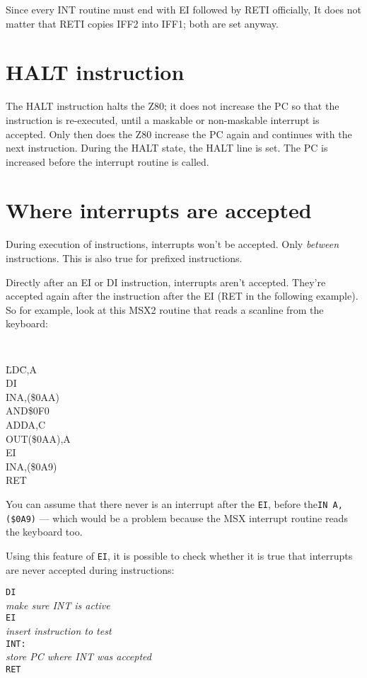 \documentclass[oneside,a4paper]{book}
\begin{document}
Since every INT routine must end with {\ttfamily EI} followed by {\ttfamily RETI} officially, It does not matter that RETI copies IFF2 into IFF1; both are set anyway.


\section{HALT instruction}

The HALT instruction halts the Z80; it does not increase the PC so that the instruction is re-executed, until a maskable or non-maskable interrupt is accepted. Only then does the Z80 increase the PC again and continues with the next instruction. During the HALT state, the HALT line is set. The PC is increased before the interrupt routine is called.


\section{Where interrupts are accepted}

During execution of instructions, interrupts won't be accepted. Only {\em between} instructions. This is also true for prefixed instructions.

Directly after an EI or DI instruction, interrupts aren't accepted. They're accepted again after the instruction after the EI (RET in the following example). So for example, look at this MSX2 routine that reads a scanline from the keyboard:

{\tt
	\begin{tabbing}
		{\qquad}\=LD{\qquad}\=C,A\+\\
		DI\\
		IN\>A,(\$0AA)\\
		AND\>\$0F0\\
		ADD\>A,C\\
		OUT\>(\$0AA),A\\
		EI\\
		IN\>A,(\$0A9)\\
		RET
	\end{tabbing}
}


You can assume that there never is an interrupt after the {\tt EI}, before the{\tt IN A,(\$0A9)} --- which would be a problem because the MSX interrupt routine reads the keyboard too.

Using this feature of {\tt EI}, it is possible to check whether it is true that interrupts are never accepted during instructions:

\begin{tabbing}
	{\qquad}\={\tt DI}\+\\
	{\em make sure INT is active}\\
	{\tt EI}\\
	{\em insert instruction to test}\-\\
	{\tt INT:}\+\\
	{\em store PC where INT was accepted}\\
	{\tt RET}
\end{tabbing}
\end{document}
